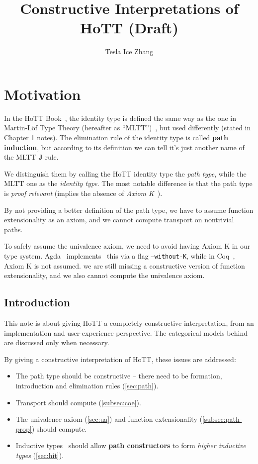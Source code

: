 \documentclass{article}
\title{Constructive Interpretations of HoTT (Draft)}
\author{Tesla Ice Zhang}
\begin{document}
\maketitle

\tableofcontents

\section{Motivation}
\label{sec:motivation}

In the HoTT Book~\cite{hottbook},
the identity type is defined the same way as the one
in Martin-L\"{o}f Type Theory (hereafter as ``MLTT'')~\cite{MLTT},
but used differently (stated in Chapter 1 notes).
The elimination rule of the identity type is called \textbf{path induction},
but according to its definition we can tell
it's just another name of the MLTT \textbf J rule.

We distinguish them by calling the HoTT identity type the \textit{path type},
while the MLTT one as the \textit{identity type}.
The most notable difference is that the path type is
\textit{proof relevant} (implies the absence of
\textit{Axiom K}~\cite{AxiomK}).

By not providing a better definition of the path type,
we have to assume function extensionality as an axiom,
and we cannot compute transport on nontrivial paths.

To safely assume the univalence axiom, we need to avoid having Axiom K
in our type system.
Agda~\cite{Agda} implements~\cite{WithoutK} this via a flag \texttt{--without-K},
while in Coq~\cite{Coq}, Axiom K is not assumed.
we are still missing a constructive version of function extensionality,
and we also cannot compute the univalence axiom.

\subsection{Introduction}
\label{subsec:introduction}

This note is about giving HoTT a completely constructive interpretation,
from an implementation and user-experience perspective.
The categorical models behind are discussed only when necessary.

By giving a constructive interpretation of HoTT,
these issues are addressed:

\begin{itemize}
\item The path type should be constructive --
  there need to be formation, introduction and
  elimination rules (\cref{sec:path}).
\item Transport should compute (\cref{subsec:coe}).
\item The univalence axiom (\cref{sec:ua}) and function extensionality
  (\cref{subsec:path-prop}) should compute.
\item Inductive types~\cite{Inductive} should allow \textbf{path constructors}
  to form \textit{higher inductive types} (\cref{sec:hit}).
\end{itemize}
\end{document}
